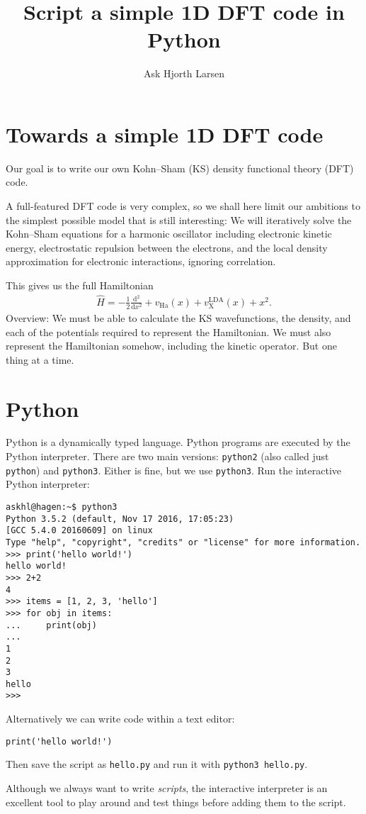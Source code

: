 \documentclass{article}
\title{Script a simple 1D DFT code in Python}
\author{Ask Hjorth Larsen}
\newcommand{\dee}[0]{\mathrm d}
\newcommand{\diff}[2]{\frac{\dee #1}{\dee #2}}
\newcommand{\Ha}[0]{\mathrm{Ha}}
\begin{document}
\section{Towards a simple 1D DFT code}

Our goal is to write our own Kohn--Sham (KS) density functional theory
(DFT) code.

A full-featured DFT code is very complex, so we shall here limit our ambitions
to the simplest possible model that is still interesting:
We will iteratively solve the Kohn--Sham
equations for a harmonic oscillator including electronic kinetic
energy, electrostatic repulsion between the electrons, and the
local density approximation for electronic interactions, ignoring correlation.

This gives us the full Hamiltonian
\begin{align}
\hat H = -\frac12 \diff{^2}{x^2} + v_\Ha(x) + v_{\mathrm X}^{\mathrm{LDA}}(x) + x^2.
\end{align}
Overview: We must be able to calculate the KS wavefunctions, the
density, and each of the potentials required to represent the
Hamiltonian.  We must also represent the Hamiltonian somehow,
including the kinetic operator.  But one thing at a time.

\section{Python}
Python is a dynamically typed language.  Python programs are executed
by the Python interpreter.
There are two main versions:
\texttt{python2} (also called just \texttt{python}) and \texttt{python3}.
Either is fine, but we use \texttt{python3}.
Run the interactive Python interpreter:

\begin{verbatim}
askhl@hagen:~$ python3
Python 3.5.2 (default, Nov 17 2016, 17:05:23)
[GCC 5.4.0 20160609] on linux
Type "help", "copyright", "credits" or "license" for more information.
>>> print('hello world!')
hello world!
>>> 2+2
4
>>> items = [1, 2, 3, 'hello']
>>> for obj in items:
...     print(obj)
...
1
2
3
hello
>>>
\end{verbatim}

Alternatively we can write code within a text editor:
\begin{lstlisting}
print('hello world!')
\end{lstlisting}
Then save the script as \texttt{hello.py} and run it with
\texttt{python3 hello.py}.

Although we always want to write \emph{scripts},
the interactive interpreter is an excellent tool to play around and test
things before adding them to the script.
\end{document}
